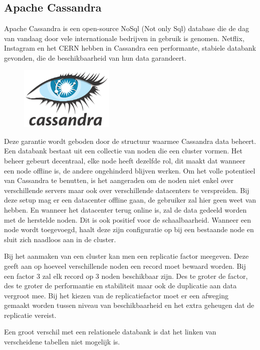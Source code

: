 \documentclass{article}
\begin{document}
	\subsection{Apache Cassandra}
	Apache Cassandra is een open-source NoSql (Not only Sql) database die de dag van vandaag door vele internationale bedrijven 
	in gebruik is genomen. 
	Netflix, Instagram en het CERN hebben in Cassandra een performante, stabiele databank gevonden, 
	die de beschikbaarheid van hun data garandeert.
	\par
	\begin{figure}
  		\includegraphics[width=0.4\textwidth]{images/cassandra.png}
	\end{figure}
	Deze garantie wordt geboden door de structuur waarmee Cassandra data beheert. 
	Een databank bestaat uit een collectie van noden die een cluster vormen. 
	Het beheer gebeurt decentraal, elke node heeft dezelfde rol, 
	dit maakt dat wanneer een node offline is, de andere ongehinderd blijven werken. 
	Om het volle potentieel van Cassandra te benutten, is het aangeraden om de noden niet enkel over verschillende servers 
	maar ook over verschillende datacenters te verspreiden. 
	Bij deze setup mag er een datacenter offline gaan, de gebruiker zal hier geen weet van hebben.  
	En wanneer het datacenter terug online is, zal de data gedeeld worden met de herstelde noden.
	Dit is ook positief voor de schaalbaarheid. 
	Wanneer een node wordt toegevoegd, haalt deze zijn configuratie op bij een bestaande node en sluit zich naadloos aan in de cluster.
	\par
	Bij het aanmaken van een cluster kan men een replicatie factor meegeven. 
	Deze geeft aan op hoeveel verschillende noden een record moet bewaard worden. 
	Bij een factor 3 zal elk record op 3 noden beschikbaar zijn. 
	Des te groter de factor, des te groter de performantie en stabiliteit maar ook de duplicatie aan data vergroot mee.
	Bij het kiezen van de replicatiefactor moet er een afweging gemaakt worden tussen niveau van beschikbaarheid en
	het extra geheugen dat de replicatie vereist.
	\par
	Een groot verschil met een relationele databank is dat het linken van verscheidene tabellen niet mogelijk is.
\end{document}
